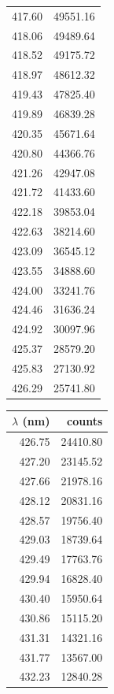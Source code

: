 \begin{table}[!h]
\begin{tabular}{rr}
          417.60 &  49551.16 \\
          418.06 &  49489.64 \\
          418.52 &  49175.72 \\
          418.97 &  48612.32 \\
          419.43 &  47825.40 \\
          419.89 &  46839.28 \\
          420.35 &  45671.64 \\
          420.80 &  44366.76 \\
          421.26 &  42947.08 \\
          421.72 &  41433.60 \\
          422.18 &  39853.04 \\
          422.63 &  38214.60 \\ 
          423.09 &  36545.12 \\
          423.55 &  34888.60 \\
          424.00 &  33241.76 \\
          424.46 &  31636.24 \\
          424.92 &  30097.96 \\
          425.37 &  28579.20 \\
          425.83 &  27130.92 \\
          426.29 &  25741.80 \\
\bottomrule
\end{tabular}        
\begin{tabular}{rr}
\toprule
 $\lambda$ (nm) &    counts \\
\midrule
          426.75 &  24410.80 \\
          427.20 &  23145.52 \\
          427.66 &  21978.16 \\
          428.12 &  20831.16 \\
          428.57 &  19756.40 \\
          429.03 &  18739.64 \\
          429.49 &  17763.76 \\
          429.94 &  16828.40 \\
          430.40 &  15950.64 \\
          430.86 &  15115.20 \\
          431.31 &  14321.16 \\
          431.77 &  13567.00 \\
          432.23 &  12840.28 \\

\end{tabular}
\end{table}

